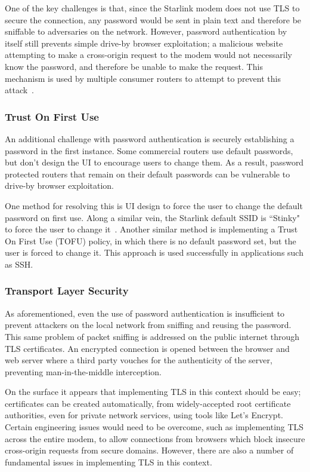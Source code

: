 One of the key challenges is that, since the Starlink modem does not use TLS to secure the connection, any password would be sent in plain text and therefore be sniffable to adversaries on the network.
However, password authentication by itself still prevents simple drive-by browser exploitation; a malicious website attempting to make a cross-origin request to the modem would not necessarily know the password, and therefore be unable to make the request.
This mechanism is used by multiple consumer routers to attempt to prevent this attack~\cite{drive_by_pharming}.

\subsubsection{Trust On First Use}

An additional challenge with password authentication is securely establishing a password in the first instance.
Some commercial routers use default passwords, but don't design the UI to encourage users to change them.
As a result, password protected routers that remain on their default passwords can be vulnerable to drive-by browser exploitation.

One method for resolving this is UI design to force the user to change the default password on first use.
Along a similar vein, the Starlink default SSID is ``Stinky" to force the user to change it~\cite{stinky_starlink}.
Another similar method is implementing a Trust On First Use (TOFU) policy, in which there is no default password set, but the user is forced to change it.
This approach is used successfully in applications such as SSH.

\subsubsection{Transport Layer Security}

As aforementioned, even the use of password authentication is insufficient to prevent attackers on the local network from sniffing and reusing the password.
This same problem of packet sniffing is addressed on the public internet through TLS certificates.
An encrypted connection is opened between the browser and web server where a third party vouches for the authenticity of the server, preventing man-in-the-middle interception.

On the surface it appears that implementing TLS in this context should be easy; certificates can be created automatically, from widely-accepted root certificate authorities, even for private network services, using tools like Let's Encrypt.
Certain engineering issues would need to be overcome, such as implementing TLS across the entire modem, to allow connections from browsers which block insecure cross-origin requests from secure domains.
However, there are also a number of fundamental issues in implementing TLS in this context.

